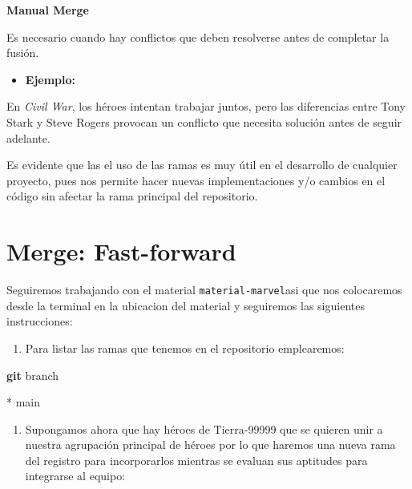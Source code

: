 \documentclass[
]{book}
\newenvironment{Shaded}{\begin{snugshade}}{\end{snugshade}}
\newcommand{\ExtensionTok}[1]{#1}
\newcommand{\FunctionTok}[1]{\textcolor[rgb]{0.13,0.29,0.53}{\textbf{#1}}}
\newcommand{\NormalTok}[1]{#1}
\providecommand{\tightlist}{%
  \setlength{\itemsep}{0pt}\setlength{\parskip}{0pt}}
\begin{document}
\textbf{Manual Merge}

Es necesario cuando hay conflictos que deben resolverse antes de completar la fusión.

\begin{itemize}
\tightlist
\item
  \textbf{Ejemplo:}
\end{itemize}

En \emph{Civil War}, los héroes intentan trabajar juntos, pero las diferencias entre Tony Stark y Steve Rogers provocan un conflicto que necesita solución antes de seguir adelante.

Es evidente que las el uso de las ramas es muy útil en el desarrollo de cualquier proyecto, pues nos permite hacer nuevas implementaciones y/o cambios en el código sin afectar la rama principal del repositorio.

\section{Merge: Fast-forward}\label{merge-fast-forward}

Seguiremos trabajando con el material \texttt{material-marvel}asi que nos colocaremos desde la terminal en la ubicacion del material y seguiremos las siguientes instrucciones:

\begin{enumerate}
\def\labelenumi{\arabic{enumi}.}
\tightlist
\item
  Para listar las ramas que tenemos en el repositorio emplearemos:
\end{enumerate}

\begin{Shaded}
\begin{Highlighting}[]
\FunctionTok{git}\NormalTok{ branch}
\end{Highlighting}
\end{Shaded}

\begin{Shaded}
\begin{Highlighting}[]
\ExtensionTok{*}\NormalTok{ main}
\end{Highlighting}
\end{Shaded}

\begin{enumerate}
\def\labelenumi{\arabic{enumi}.}
\setcounter{enumi}{1}
\tightlist
\item
  Supongamos ahora que hay héroes de Tierra-99999 que se quieren unir a nuestra agrupación principal de héroes por lo que haremos una nueva rama del registro para incorporarlos mientras se evaluan sus aptitudes para integrarse al equipo:
\end{enumerate}
\end{document}

